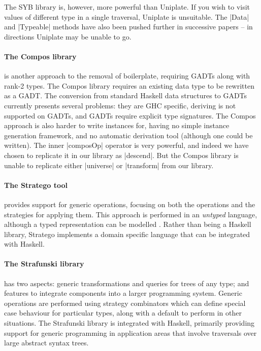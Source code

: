 The SYB library is, however, more powerful than Uniplate. If you wish to visit values of different type in a single traversal, Uniplate is unsuitable. The |Data| and |Typeable| methods have also been pushed further in successive papers \citep{lammel:syb2,lammel:syb3} -- in directions Uniplate may be unable to go.

\paragraph{The Compos library} \citep{bringert:compos} is another approach to the removal of boilerplate, requiring GADTs \citep{spj:gadt} along with rank-2 types. The Compos library requires an existing data type to be rewritten as a GADT. The conversion from standard Haskell data structures to GADTs currently presents several problems: they are GHC specific, deriving is not supported on GADTs, and GADTs require explicit type signatures. The Compos approach is also harder to write instances for, having no simple instance generation framework, and no automatic derivation tool (although one could be written). The inner |composOp| operator is very powerful, and indeed we have chosen to replicate it in our library as |descend|. But the Compos library is unable to replicate either |universe| or |transform| from our library.

\paragraph{The Stratego tool} \citep{stratego} provides support for generic operations, focusing on both the operations and the strategies for applying them. This approach is performed in an \textit{untyped} language, although a typed representation can be modelled \cite{lammel:typed_generic_strategies}. Rather than being a Haskell library, Stratego implements a domain specific language that can be integrated with Haskell.

\paragraph{The Strafunski library} \citep{strafunski, lammel:polymorphic_symphony} has two aspects: generic transformations and queries for trees of any type; and features to integrate components into a larger programming system. Generic operations are performed using strategy combinators which can define special case behaviour for particular types, along with a default to perform in other situations. The Strafunski library is integrated with Haskell, primarily providing support for generic programming in application areas that involve traversals over large abstract syntax trees.

